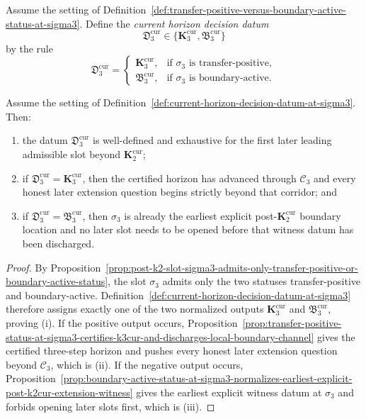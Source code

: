 \begin{definition}
\label{def:current-horizon-decision-datum-at-sigma3}
Assume the setting of Definition~\ref{def:transfer-positive-versus-boundary-active-status-at-sigma3}. Define the \emph{current horizon decision datum}
\[
 \mathfrak D_3^{\mathrm{cur}}\in\{\mathbf K_3^{\mathrm{cur}},\mathfrak B_3^{\mathrm{cur}}\}
\]
by the rule
\[
 \mathfrak D_3^{\mathrm{cur}}=
 \begin{cases}
 \mathbf K_3^{\mathrm{cur}}, & \text{if }\sigma_3\text{ is transfer-positive},\\[2mm]
 \mathfrak B_3^{\mathrm{cur}}, & \text{if }\sigma_3\text{ is boundary-active}.
 \end{cases}
\]
\end{definition}

\begin{proposition}
\label{prop:first-slot-beyond-k2cur-admits-finite-decision-normal-form}
Assume the setting of Definition~\ref{def:current-horizon-decision-datum-at-sigma3}. Then:
\begin{enumerate}[label=(\roman*)]
 \item the datum $\mathfrak D_3^{\mathrm{cur}}$ is well-defined and exhaustive for the first later leading admissible slot beyond $\mathbf K_2^{\mathrm{cur}}$;
 \item if $\mathfrak D_3^{\mathrm{cur}}=\mathbf K_3^{\mathrm{cur}}$, then the certified horizon has advanced through $\mathcal C_3$ and every honest later extension question begins strictly beyond that corridor; and
 \item if $\mathfrak D_3^{\mathrm{cur}}=\mathfrak B_3^{\mathrm{cur}}$, then $\sigma_3$ is already the earliest explicit post-$\mathbf K_2^{\mathrm{cur}}$ boundary location and no later slot needs to be opened before that witness datum has been discharged.
\end{enumerate}
\end{proposition}

\begin{proof}
By Proposition~\ref{prop:post-k2-slot-sigma3-admits-only-transfer-positive-or-boundary-active-status}, the slot $\sigma_3$ admits only the two statuses transfer-positive and boundary-active. Definition~\ref{def:current-horizon-decision-datum-at-sigma3} therefore assigns exactly one of the two normalized outputs $\mathbf K_3^{\mathrm{cur}}$ and $\mathfrak B_3^{\mathrm{cur}}$, proving (i). If the positive output occurs, Proposition~\ref{prop:transfer-positive-status-at-sigma3-certifies-k3cur-and-discharges-local-boundary-channel} gives the certified three-step horizon and pushes every honest later extension question beyond $\mathcal C_3$, which is (ii). If the negative output occurs, Proposition~\ref{prop:boundary-active-status-at-sigma3-normalizes-earliest-explicit-post-k2cur-extension-witness} gives the earliest explicit witness datum at $\sigma_3$ and forbids opening later slots first, which is (iii).
\end{proof}

